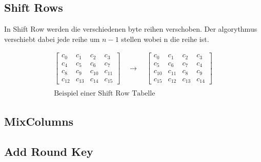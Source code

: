 \subsection{Shift Rows}
In Shift Row werden die verschiedenen byte reihen verschoben. Der algorythmus verschiebt dabei jede reihe um $n-1$ stellen wobei n die reihe ist.

\noindent
\flushleft
\[
\begin{array}{c}
\begin{bmatrix}
c_0  & c_1  & c_2  & c_3  \\
c_4  & c_5  & c_6  & c_7  \\
c_8  & c_9  & c_{10} & c_{11} \\
c_{12} & c_{13} & c_{14} & c_{15}
\end{bmatrix}
\quad\rightarrow\quad
\begin{bmatrix}
c_0  & c_1  & c_2  & c_3  \\
c_5  & c_6  & c_7  & c_4  \\
c_{10} & c_{11} & c_8  & c_9  \\
c_{15} & c_{12} & c_{13} & c_{14}
\end{bmatrix}\\[1pt]
\\[1pt]
\text{Beispiel einer Shift Row Tabelle}
\end{array}
\]
\flushleft
\subsection{MixColumns}
\subsection{Add Round Key}

